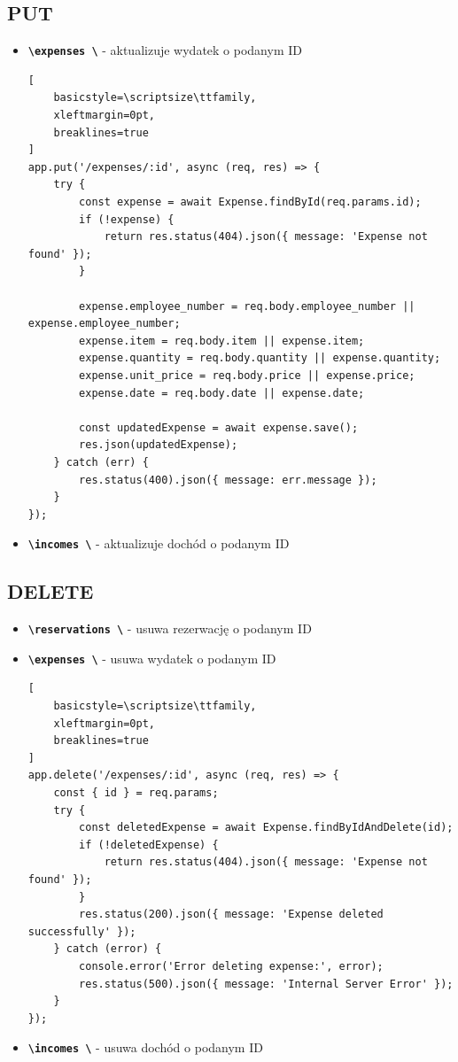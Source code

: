 \documentclass[12pt]{article}
\begin{document}
\subsection{PUT}
\begin{itemize}
    \item \textbf{\texttt{\textbackslash expenses \textbackslash}} - aktualizuje wydatek o podanym ID
\begin{lstlisting}[
    basicstyle=\scriptsize\ttfamily,
    xleftmargin=0pt,
    breaklines=true
]
app.put('/expenses/:id', async (req, res) => {
    try {
        const expense = await Expense.findById(req.params.id);
        if (!expense) {
            return res.status(404).json({ message: 'Expense not found' });
        }

        expense.employee_number = req.body.employee_number || expense.employee_number;
        expense.item = req.body.item || expense.item;
        expense.quantity = req.body.quantity || expense.quantity;
        expense.unit_price = req.body.price || expense.price;
        expense.date = req.body.date || expense.date;

        const updatedExpense = await expense.save();
        res.json(updatedExpense);
    } catch (err) {
        res.status(400).json({ message: err.message });
    }
});
\end{lstlisting}
    \item \textbf{\texttt{\textbackslash incomes \textbackslash}} - aktualizuje dochód o podanym ID
\end{itemize}


\subsection{DELETE}
\begin{itemize}
    \item \textbf{\texttt{\textbackslash reservations \textbackslash}} - usuwa rezerwację o podanym ID
    \item \textbf{\texttt{\textbackslash expenses \textbackslash}} - usuwa wydatek o podanym ID
\begin{lstlisting}[
    basicstyle=\scriptsize\ttfamily,
    xleftmargin=0pt,
    breaklines=true
]
app.delete('/expenses/:id', async (req, res) => {
    const { id } = req.params;
    try {
        const deletedExpense = await Expense.findByIdAndDelete(id);
        if (!deletedExpense) {
            return res.status(404).json({ message: 'Expense not found' });
        }
        res.status(200).json({ message: 'Expense deleted successfully' });
    } catch (error) {
        console.error('Error deleting expense:', error);
        res.status(500).json({ message: 'Internal Server Error' });
    }
});
\end{lstlisting}
    \item \textbf{\texttt{\textbackslash incomes \textbackslash}} - usuwa dochód o podanym ID
\end{itemize}
\end{document}
